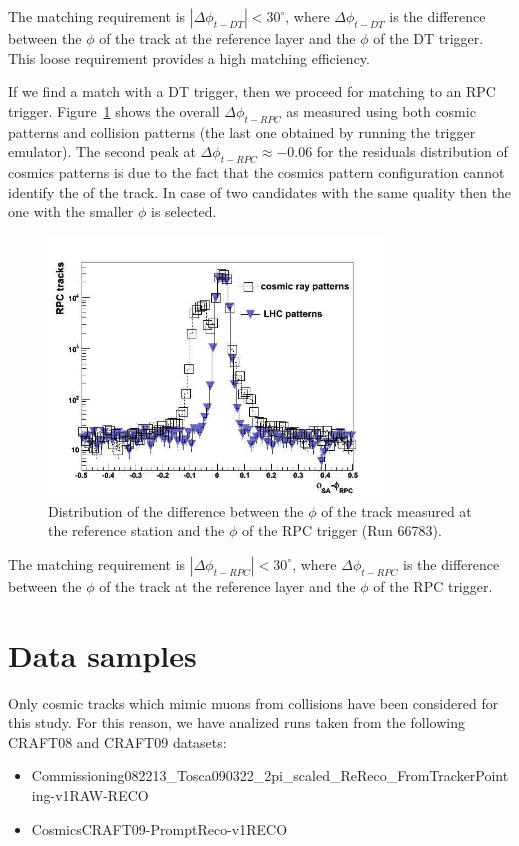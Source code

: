 The matching requirement is $|\Delta\phi_{t-DT}| < 30^\circ$,
where $\Delta\phi_{t-DT}$ is the difference 
between the $\phi$ of the track at the reference layer and
the $\phi$ of the DT trigger. This loose requirement
provides a high matching efficiency.

If we find a match with a DT trigger, then we proceed
for matching to an RPC trigger. 
Figure~\ref{fig:trigger_residuals} shows the overall $\Delta\phi_{t-RPC}$ as measured 
using both cosmic patterns and collision patterns (the
last one obtained by running the trigger emulator).
The second peak at $\Delta\phi_{t-RPC} \approx -0.06$ for the residuals distribution 
of cosmics patterns is due to the fact that the cosmics 
pattern configuration cannot identify the \pt of the track.
In case of two candidates with the same quality then the one
with the smaller $\phi$ is selected.

\begin{figure}[hbtp]
  \begin{center}%
    \includegraphics[width=0.8\textwidth]{residuals_rpc}
    \hspace{1cm}
    \caption{Distribution of the difference between the $\phi$ of the track measured 
    at the reference station and the $\phi$ of the RPC trigger (Run 66783).}
    \label{fig:trigger_residuals}
  \end{center}
\end{figure}

The matching requirement is $|\Delta\phi_{t-RPC}| < 30^\circ$,
where $\Delta\phi_{t-RPC}$ is the difference 
between the $\phi$ of the track at the reference layer 
and the $\phi$ of the RPC trigger.

\section{Data samples}
Only cosmic tracks which mimic muons from collisions
have been considered for this study. 
For this reason, we have analized runs taken from the 
following CRAFT08 and CRAFT09 datasets:
\begin{itemize}
\item
Commissioning08\/2213\_Tosca090322\_2pi\_scaled\_ReReco\_FromTrackerPointing-v1\/RAW-RECO
\item
Cosmics\/CRAFT09-PromptReco-v1\/RECO
\end{itemize}

